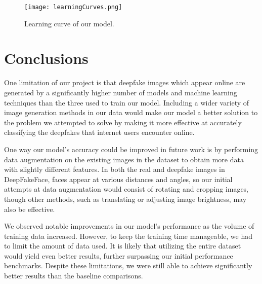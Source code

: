 \documentclass[10pt]{article}
\begin{document}
\begin{figure}[htb!]
    \centering
    \texttt{[image: learningCurves.png]}
    \caption{Learning curve of our model.}
    \label{fig:fig4}
\end{figure}



\section{Conclusions}


One limitation of our project is that deepfake images which appear online are generated by a significantly higher number of models and machine learning techniques than the three used to train our model. Including a wider variety of image generation methods in our data would make our model a better solution to the problem we attempted to solve by making it more effective at accurately classifying the deepfakes that internet users encounter online.

One way our model's accuracy could be improved in future work is by performing data augmentation on the existing images in the dataset to obtain more data with slightly different features. In both the real and deepfake images in DeepFakeFace, faces appear at various distances and angles, so our initial attempts at data augmentation would consist of rotating and cropping images, though other methods, such as translating or adjusting image brightness, may also be effective.

We observed notable improvements in our model's performance as the volume of training data increased. However, to keep the training time manageable, we had to limit the amount of data used. It is likely that utilizing the entire dataset would yield even better results, further surpassing our initial performance benchmarks. Despite these limitations, we were still able to achieve significantly better results than the baseline comparisons. 





\end{document}
